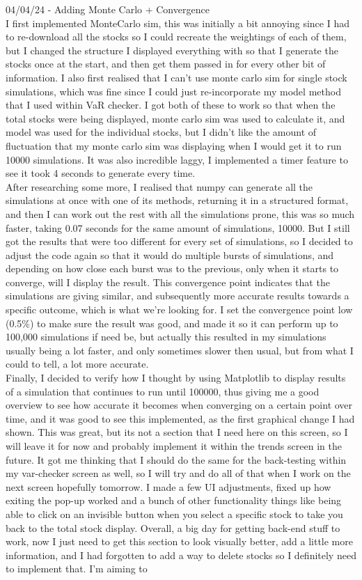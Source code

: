 \documentclass{article}
\begin{document}
04/04/24 - Adding Monte Carlo + Convergence\\
I first implemented MonteCarlo sim, this was initially a bit annoying since I had to re-download all the stocks so I could recreate the weightings of each of them, but I changed the structure I displayed everything with so that I generate the stocks once at the start, and then get them passed in for every other bit of information. I also first realised that I can't use monte carlo sim for single stock simulations, which was fine since I could just re-incorporate my model method that I used within VaR checker. I got both of these to work so that when the total stocks were being displayed, monte carlo sim was used to calculate it, and model was used for the individual stocks, but I didn't like the amount of fluctuation that my monte carlo sim was displaying when I would get it to run 10000 simulations. It was also incredible laggy, I implemented a timer feature to see it took 4 seconds to generate every time. \\After researching some more, I realised that numpy can generate all the simulations at once with one of its methods, returning it in a structured format, and then I can work out the rest with all the simulations prone, this was so much faster, taking 0.07 seconds for the same amount of simulations, 10000. But I still got the results that were too different for every set of simulations, so I decided to adjust the code again so that it would do multiple bursts of simulations, and depending on how close each burst was to the previous, only when it starts to converge, will I display the result. This convergence point indicates that the simulations are giving similar, and subsequently more accurate results towards a specific outcome, which is what we're looking for. I set the convergence point low (0.5\%) to make sure the result was good, and made it so it can perform up to 100,000 simulations if need be, but actually this resulted in my simulations usually being a lot faster, and only sometimes slower then usual, but from what I could to tell, a lot more accurate. \\Finally, I decided to verify how I thought by using Matplotlib to display results of a simulation that continues to run until 100000, thus giving me a good overview to see how accurate it becomes when converging on a certain point over time, and it was good to see this implemented, as the first graphical change I had shown. This was great, but its not a section that I need here on this screen, so I will leave it for now and probably implement it within the trends screen in the future. It got me thinking that I should do the same for the back-testing within my var-checker screen as well, so I will try and do all of that when I work on the next screen hopefully tomorrow. I made a few UI adjustments, fixed up how exiting the pop-up worked and a bunch of other functionality things like being able to click on an invisible button when you select a specific stock to take you back to the total stock display. Overall, a big day for getting back-end stuff to work, now I just need to get this section to look visually better, add a little more information, and I had forgotten to add a way to delete stocks so I definitely need to implement that. I'm aiming to 
\end{document}
